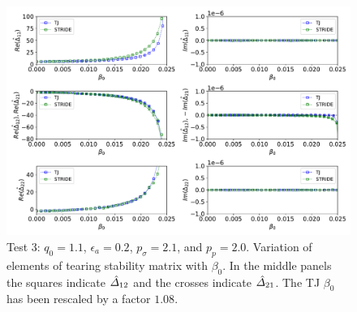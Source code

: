 \documentclass[12pt,prb,aps,notitlepage]{revtex4-1}
\begin{document}
\newpage
\begin{figure}
\centerline{\includegraphics[width=1.1\textwidth]{Test4.pdf}}
\caption{Test 3: $q_0=1.1$, $\epsilon_a=0.2$, $p_\sigma=2.1$,  and $p_p=2.0$. Variation of elements of tearing stability matrix with $\beta_0$. In the middle panels the squares
indicate  $\hat{\mit\Delta}_{12}$ and the crosses indicate $\hat{\mit\Delta}_{21}$. The TJ $\beta_0$ has been rescaled by a factor $1.08$.}
\end{figure}
\end{document}
